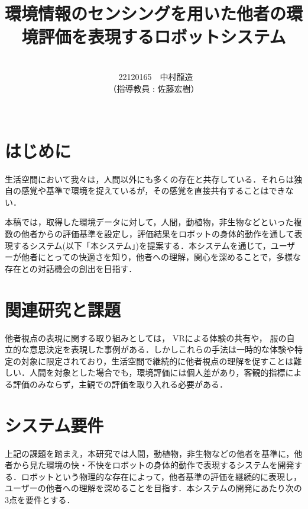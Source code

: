 \documentclass[paper=a4paper,jafontsize=9pt,head_space=15mm,gutter=20mm,
twocolumn,number_of_lines=49, line_length=26zw]{myuarticle}
\begin{document}
\title{{\Large\bfseries\gtfamily 環境情報のセンシングを用いた他者の環境評価を表現するロボットシステム}}
\author{\\\ 22120165　中村龍造 \\（指導教員 : 佐藤宏樹）\\ \\}
\date{}
\maketitle

\section{はじめに}
生活空間において我々は，人間以外にも多くの存在と共存している．それらは独自の感覚や基準で環境を捉えているが，その感覚を直接共有することはできない．%

本稿では，取得した環境データに対して，人間，動植物，非生物などといった複数の他者からの評価基準を設定し，評価結果をロボットの身体的動作を通して表現するシステム(以下「本システム」)を提案する．本システムを通じて，ユーザーが他者にとっての快適さを知り，他者への理解，関心を深めることで，多様な存在との対話機会の創出を目指す．

\section{関連研究と課題}

他者視点の表現に関する取り組みとしては，
VRによる体験の共有や\cite{--EyesAnimal}，
服の自立的な意思決定を表現した事例\cite{--ソンヨン}がある．しかしこれらの手法は一時的な体験や特定の対象に限定されており，生活空間で継続的に他者視点の理解を促すことは難しい．人間を対象とした場合でも，環境評価には個人差があり，客観的指標による評価のみならず，主観での評価を取り入れる必要がある\cite{Coulby-2020-ScopingReviewTechnologicalApproaches}．

\section{システム要件}

上記の課題を踏まえ，本研究では人間，動植物，非生物などの他者を基準に，他者から見た環境の快・不快をロボットの身体的動作で表現するシステムを開発する．ロボットという物理的な存在によって，他者基準の評価を継続的に表現し，ユーザーの他者への理解を深めることを目指す．本システムの開発にあたり次の3点を要件とする．
\end{document}

